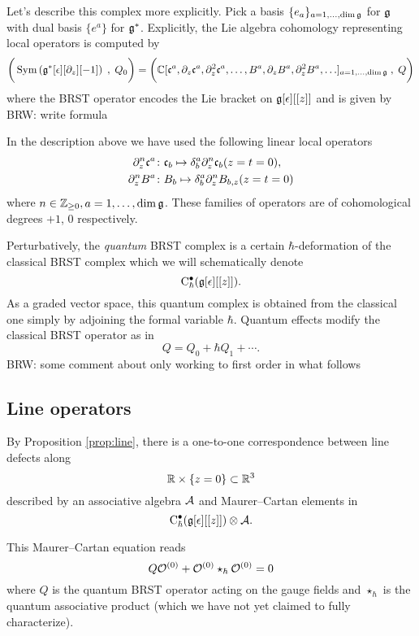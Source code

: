 \documentclass[11pt]{amsart}
\def\brian#1{{\textcolor{blue!65!red}{BRW: {#1}}}}
\begin{document}

Let's describe this complex more explicitly. 
Pick a basis $\{e_a\}_{a = 1,\ldots, \dim \mathfrak g}$ for $\mathfrak g$ with dual basis $\{e^a\}$ for $\mathfrak g^*$. 
Explicitly, the Lie algebra cohomology representing local operators is computed by 
\[
\bigg(\operatorname{Sym}\left(\mathfrak g^*[\epsilon] [\partial_z] [-1] \right) \; , \; Q_0 \bigg) = \bigg(\mathbb C[\mathfrak c^a, \partial_z \mathfrak c^a , \partial^2_z \mathfrak c^a, \ldots, B^a , \partial_z B^a , \partial_z^2 B^a, \ldots]_{a=1, \ldots, \dim \mathfrak g} \; , \; Q \bigg)
\]
where the BRST operator encodes the Lie bracket on $\mathfrak g[\epsilon][[z]]$ and is given by \brian{write formula}

In the description above we have used the following linear local operators
\begin{align*}
\partial_z^n \mathfrak c^a \colon & \mathfrak c_b \mapsto \delta_b^a \partial^n_z \mathfrak c_b (z=t=0), \\
\partial_z^n B^a \colon & B_b \mapsto \delta_b^a \partial_z^n B_{b,z} (z=t=0) 
\end{align*}
where $n \in \mathbb Z_{\geq 0}, a = 1,\ldots, \dim \mathfrak g$. 
These families of operators are of cohomological degrees $+1$, $0$ respectively. 

Perturbatively, the {\em quantum} BRST complex is a certain $\hbar$-deformation of the classical BRST complex which we will schematically denote
\[
{\rm C}^\bullet_\hbar (\mathfrak g[\epsilon][[z]])  .
\]
As a graded vector space, this quantum complex is obtained from the classical one simply by adjoining the formal variable $\hbar$. 
Quantum effects modify the classical BRST operator as in
\[
Q = Q_0 + \hbar Q_1 + \cdots .
\]
\brian{some comment about only working to first order in what follows}

\subsection*{Line operators}

By Proposition \ref{prop:line}, there is a one-to-one correspondence between line defects along
\[
\mathbb R \times \{z=0\} \subset \mathbb R^3 
\]
described by an associative algebra $\mathcal A$ and Maurer--Cartan elements in 
\begin{equation}\label{eqn:criticalobs}
{\rm C}_\hbar^\bullet(\mathfrak g[\epsilon][[z]]) \otimes \mathcal A .
\end{equation}

This Maurer--Cartan equation reads
\begin{equation}\label{eqn:mccs}
Q \mathcal O^{(0)} + \mathcal O^{(0)} \star_\hbar \mathcal O^{(0)} = 0 
\end{equation}
where $Q$ is the quantum BRST operator acting on the gauge fields and $\star_\hbar$ is the quantum associative product (which we have not yet claimed to fully characterize). 
\end{document}
